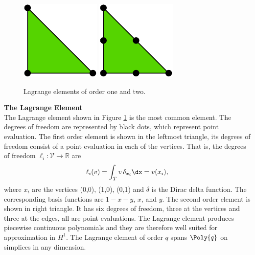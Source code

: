 \begin{figure}
  \centering
  \includegraphics[width=\twofigs]{chapters/kirby-6/pdf/P1.pdf}
  \includegraphics[width=\twofigs]{chapters/kirby-6/pdf/P2.pdf}
  \caption{Lagrange elements of order one and two.}
  \label{Lagrange}
\end{figure}

\begin{example}{\bf{The Lagrange Element}} \\
The Lagrange element shown in Figure \ref{Lagrange} is the most common
element.  The degrees of freedom are represented by black dots, which
represent point evaluation.  The first order element is shown in the
leftmost triangle, its degrees of freedom consist of a point evaluation
in each of the vertices.  That is, the degrees of freedom $\ell_i :
\mathcal{V} \rightarrow \mathbb{R}$ are
\begin{equation}
\ell_i ( v) = \int_{T} v \, \delta_{x_i} \dx = v(x_i),
\end{equation}
where $x_i$ are the vertices (0,0), (1,0), (0,1) and $\delta$ is the Dirac delta function.  The corresponding basis
functions are $1-x-y$, $x$, and $y$.  The second order element is shown
in right triangle. It has six degrees of freedom, three at the vertices
and three at the edges, all are point evaluations.  The Lagrange element
produces piecewise continuous polynomials and they are therefore well
suited for approximation in $H^1$.  The Lagrange element of order $q$
spans $\Poly{q}$ on simplices in any dimension.
\end{example}

